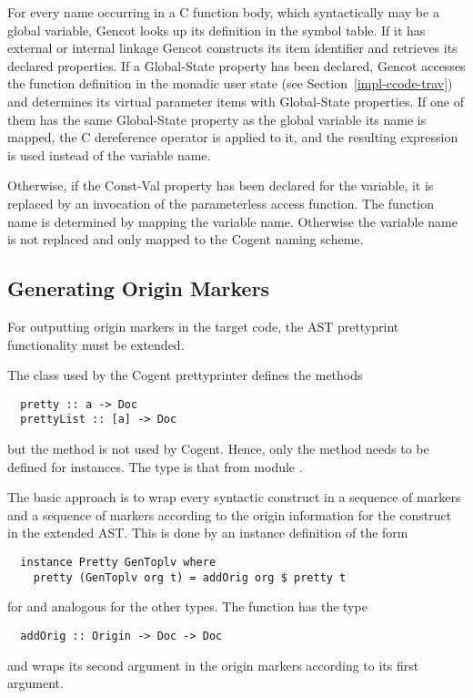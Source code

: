 For every name occurring in a C function body, which syntactically may be a global variable, Gencot looks up 
its definition in the symbol table. If it has external or internal linkage Gencot constructs its item identifier
and retrieves its declared properties. If a Global-State property has been declared, Gencot accesses the 
function definition in the monadic user state (see Section~\ref{impl-ccode-trav}) and determines its virtual
parameter items with Global-State properties. If one of them has the same Global-State property as the global
variable its name is mapped, the C dereference operator \code{*} is applied to it, and the resulting expression
is used instead of the variable name.

Otherwise, if the Const-Val property has been declared for the variable, it is replaced by an invocation of the 
parameterless access function. The function name is determined by mapping the variable name. Otherwise the 
variable name is not replaced and only mapped to the Cogent naming scheme.

\subsection{Generating Origin Markers}
\label{impl-ccode-origin}

For outputting origin markers in the target code, the AST prettyprint functionality must be extended.

The class  used by the Cogent prettyprinter defines the methods
\begin{verbatim}
  pretty :: a -> Doc
  prettyList :: [a] -> Doc
\end{verbatim}
but the method  is not used by Cogent. Hence, only the method  needs to be defined
for instances. The type  is that from module .

The basic approach is to wrap every syntactic construct in a sequence of  markers and 
a sequence of  markers according to the origin information for the construct in the extended AST. 
This is done by an instance definition of the form
\begin{verbatim}
  instance Pretty GenToplv where
    pretty (GenToplv org t) = addOrig org $ pretty t
\end{verbatim}
for  and analogous for the other types. The function  has the type
\begin{verbatim}
  addOrig :: Origin -> Doc -> Doc
\end{verbatim}
and wraps its second argument in the origin markers according to its first argument.

